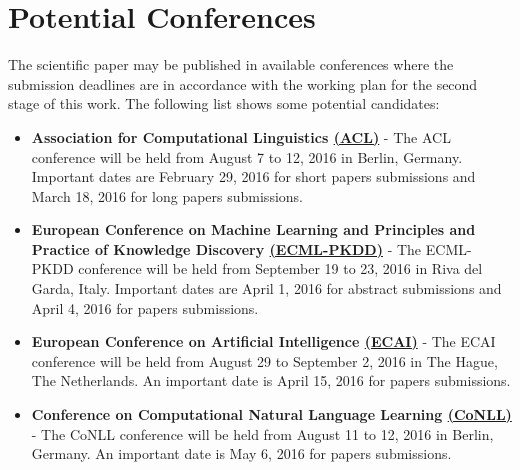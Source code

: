 \chapter{Potential Conferences} %

\label{AppendixA} %


The scientific paper may be published in available conferences where the submission deadlines are in accordance with the working plan for the second stage of this work. The following list shows some potential candidates:
\begin{itemize}
	\item \textbf{Association for Computational Linguistics \href{http://acl2016.org}{(ACL)}} - The ACL conference will be held from August 7 to 12, 2016 in Berlin, Germany. Important dates are February 29, 2016 for short papers submissions and March 18, 2016 for long papers submissions.

	\item \textbf{European Conference on Machine Learning and Principles and Practice of Knowledge Discovery \href{http://www.ecmlpkdd2016.org}{(ECML-PKDD)}} - The ECML-PKDD conference will be held from September 19 to 23, 2016 in Riva del Garda, Italy. Important dates are April 1, 2016 for abstract submissions and April 4, 2016 for papers submissions.

    \item \textbf{European Conference on Artificial Intelligence \href{http://www.ecai2016.org}{(ECAI)}} - The ECAI conference will be held from August 29 to September 2, 2016 in The Hague, The Netherlands. An important date is April 15, 2016 for papers submissions.
    
    
    \item \textbf{Conference on Computational Natural Language Learning \href{http://www.conll.org/cfp-2016}{(CoNLL)}} - The CoNLL conference will be held from August 11 to 12, 2016 in Berlin, Germany. An important date is May 6, 2016 for papers submissions.
    

\end{itemize}
